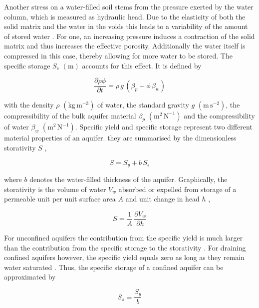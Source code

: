 Another stress on a water-filled soil stems from the pressure exerted by the water column, which is measured as hydraulic head. 
Due to the elasticity of both the solid matrix and the water in the voids this leads to a variability of the amount of stored water \parencite{Fetter.2001}. 
For one, an increasing pressure induces a contraction of the solid matrix and thus increases the effective porosity. 
Additionally the water itself is compressed in this case, thereby allowing for more water to be stored. 
The specific storage $S_s$ $(\textrm{m})$ accounts for this effect. 
It is defined by

\begin{equation}
    \frac{\partial \rho \phi}{\partial t} = \rho \, g \, \left( \beta_p + \phi \, \beta_w \right)
\end{equation}

\noindent with the density $\rho$ $(\textrm{kg} \, \textrm{m}^{-3})$ of water, the standard gravity $g$ $(\textrm{m} \, \textrm{s}^{-2})$, the compressibility of the bulk aquifer material $\beta_p$ $(\textrm{m}^{2} \, \textrm{N}^{-1})$ and the compressibility of water $\beta_w$ $(\textrm{m}^{2} \, \textrm{N}^{-1})$. 
Specific yield and specific storage represent two different material properties of an aquifer. 
they are summarised by the dimensionless storativity $S$ \parencite{Fetter.2001},

\begin{equation}
    \label{Eq-Storativity}
    S = S_y + b \, S_s
\end{equation}

\noindent where $b$ denotes the water-filled thickness of the aquifer. 
Graphically, the storativity is the volume of water $V_w$ absorbed or expelled from storage of a permeable unit per unit surface area $A$ and unit change in head $h$ \parencite{Fetter.2001},

\begin{equation}
    S = \frac{1}{A} \, \frac{\partial V_w}{\partial h}
\end{equation}

For unconfined aquifers the contribution from the specific yield is much larger than the contribution from the specific storage to the storativity \parencite{Todd.2005}. 
For draining confined aquifers however, the specific yield equals zero as long as they remain water saturated \parencite{Fetter.2001}. 
Thus, the specific storage of a confined aquifer can be approximated by

\begin{equation}
    \label{Eq-SsSy}
    S_s = \frac{S_y}{b}
\end{equation}

